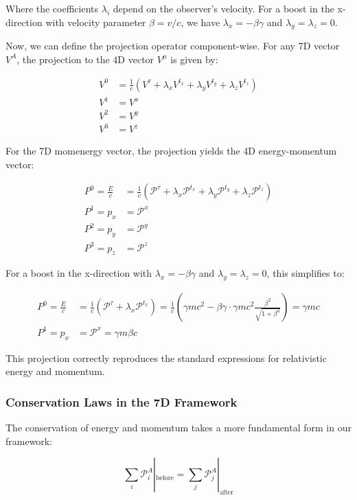 \documentclass{article}
\begin{document}
Where the coefficients $\lambda_i$ depend on the observer's velocity. For a boost in the x-direction with velocity parameter $\beta = v/c$, we have $\lambda_x = -\beta\gamma$ and $\lambda_y = \lambda_z = 0$.

Now, we can define the projection operator component-wise. For any 7D vector $V^A$, the projection to the 4D vector $V^\mu$ is given by:

\begin{align}
V^0 &= \frac{1}{c}(V^\tau + \lambda_x V^{t_x} + \lambda_y V^{t_y} + \lambda_z V^{t_z}) \\
V^1 &= V^x \\
V^2 &= V^y \\
V^3 &= V^z
\end{align}

For the 7D momenergy vector, the projection yields the 4D energy-momentum vector:

\begin{align}
P^0 = \frac{E}{c} &= \frac{1}{c}(\mathcal{P}^\tau + \lambda_x \mathcal{P}^{t_x} + \lambda_y \mathcal{P}^{t_y} + \lambda_z \mathcal{P}^{t_z}) \\
P^1 = p_x &= \mathcal{P}^x \\
P^2 = p_y &= \mathcal{P}^y \\
P^3 = p_z &= \mathcal{P}^z
\end{align}

For a boost in the x-direction with $\lambda_x = -\beta\gamma$ and $\lambda_y = \lambda_z = 0$, this simplifies to:

\begin{align}
P^0 = \frac{E}{c} &= \frac{1}{c}(\mathcal{P}^\tau + \lambda_x \mathcal{P}^{t_x}) = \frac{1}{c}(\gamma mc^2 - \beta\gamma \cdot \gamma mc^2 \frac{\beta^2}{\sqrt{1+\beta^4}}) = \gamma mc \\
P^1 = p_x &= \mathcal{P}^x = \gamma m\beta c
\end{align}

This projection correctly reproduces the standard expressions for relativistic energy and momentum.

\subsubsection{Conservation Laws in the 7D Framework}

The conservation of energy and momentum takes a more fundamental form in our framework:

\begin{equation}
\sum_i \mathcal{P}^A_i|_{\text{before}} = \sum_j \mathcal{P}^A_j|_{\text{after}}
\end{equation}
\end{document}
